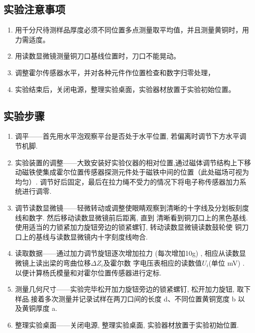 \documentclass[UTF8]{article}
\theoremstyle{MyLineTheoremStyle} %
\theoremstyle{MyBlockTheoremStyle} %
\theoremstyle{MySubsubsectionStyle} %
\begin{document}
\subsection{实验注意事项}
\begin{enumerate}
\item 用千分尺待测样品厚度必须不同位置多点测量取平均值，并且测量黄铜时，用力需适度。

\item 用读数显微镜测量铜刀口基线位置时，刀口不能晃动。

\item 调整霍尔传感器水平，并对各种元件作位置检查和数字归零处理，

\item 实验结束后，关闭电源，整理实验桌面，实验器材放置于实验初始位置。
\end{enumerate}

\subsection{实验步骤}

\begin{enumerate}
\item 调平——首先用水平泡观察平台是否处于水平位置, 若偏离时调节下方水平调节机脚. 

\item 实验装置的调整——大致安装好实验仪器的相对位置,通过磁体调节结构上下移动磁铁使集成霍尔位置传感器探测元件处于磁铁中间的位置（此处磁场可视为均匀）.
调节好后固定，最后在拉力绳不受力的情况下将电子称传感器加力系统进行调零.


\item 调节读数显微镜——轻微转动或调整使眼睛观察到清晰的十字线及分划板刻度线和数字. 然后移动读数显微镜前后距离, 直到
清晰看到铜刀口上的黑色基线. 使用适当的力锁紧加力旋钮旁边的锁紧螺钉, 转动读数显微镜读数鼓轮使
铜刀口上的基线与读数显微镜内十字刻度线吻合.

\item 读取数据——通过加力调节旋钮逐次增加拉力 (每次增加10g) , 相应从读数显微镜上读出梁的弯曲位移$\Delta Z_i$及霍尔数
字电压表相应的读数值$U_i$(单位 mV) . 以便计算杨氏模量和对霍尔位置传感器进行定标.

\item 测量几何尺寸——实验完毕松开加力旋钮旁边的锁紧螺钉, 松开加力旋钮, 取下样品.接着多次测量并记录试样在两刀口间的长度 d、不同位置黄铜宽度 b 以及黄铜厚度 a.

\item 整理实验桌面——关闭电源, 整理实验桌面, 实验器材放置于实验初始位置.
\end{enumerate}
\end{document}
